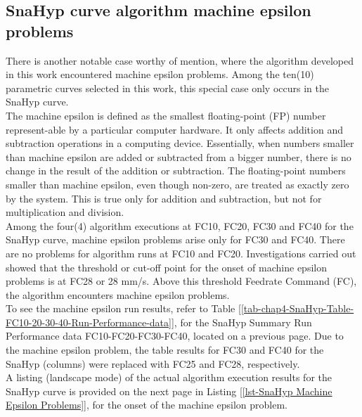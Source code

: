 \clearpage
\pagebreak

\subsection{SnaHyp curve algorithm machine epsilon problems}
\label{ssec-Algorithm validation and verification of SnaHyp curve}

There is another notable case worthy of mention, where the algorithm developed in this work encountered machine epsilon problems. Among the ten(10) parametric curves selected in this work, this special case only occurs in the SnaHyp curve.\\ 

The machine epsilon is defined as the smallest floating-point (FP) number represent-able by a particular computer hardware. It only affects addition and subtraction operations in a computing device. Essentially, when numbers smaller than machine epsilon are added or subtracted from a bigger number, there is no change in the result of the addition or subtraction. The floating-point numbers smaller than machine epsilon, even though non-zero, are treated as exactly zero by the system. This is true only for addition and subtraction, but not for multiplication and division.\\

Among the four(4) algorithm executions at FC10, FC20, FC30 and FC40 for the SnaHyp curve, machine epsilon problems arise only for FC30 and FC40. There are no problems for algorithm runs at FC10 and FC20. Investigations carried out showed that the threshold or cut-off point for the onset of machine epsilon problems is at FC28 or 28 mm/s. Above this threshold Feedrate Command (FC), the algorithm encounters machine epsilon problems.\\

To see the machine epsilon run results, refer to Table [\ref{tab-chap4-SnaHyp-Table-FC10-20-30-40-Run-Performance-data}], for the SnaHyp Summary Run Performance data FC10-FC20-FC30-FC40, located on a previous page. Due to the machine epsilon problem, the table results for FC30 and FC40 for the SnaHyp (columns) were replaced with FC25 and FC28, respectively. \\

A listing (landscape mode) of the actual algorithm execution results for the SnaHyp curve is provided on the next page in Listing [\ref{lst-SnaHyp Machine Epsilon Problems}], for the onset of the machine epsilon problem. \\

